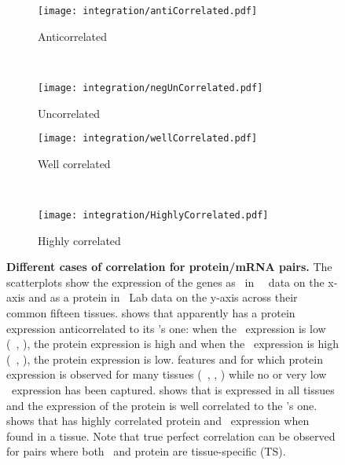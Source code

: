 \begin{figure}[!htbp]
    \begin{subfigure}[h]{0.49\textwidth}
        \centering \texttt{[image: integration/antiCorrelated.pdf]}
        \caption{Anticorrelated}\label{fig:caseAnticor}
    \end{subfigure}~%
    \begin{subfigure}[h]{0.49\textwidth}
        \centering \texttt{[image: integration/negUnCorrelated.pdf]}
        \caption{Uncorrelated}\label{fig:caseUncor}
    \end{subfigure}
    \vspace{1mm}

    \begin{subfigure}[h]{0.49\textwidth}
        \centering \texttt{[image: integration/wellCorrelated.pdf]}
        \caption{Well correlated}\label{fig:caseFairlyCor}
    \end{subfigure}~%
    \begin{subfigure}[h]{0.49\textwidth}
        \centering \texttt{[image: integration/HighlyCorrelated.pdf]}
        \caption{Highly correlated}\label{fig:caseHighlyCor}
    \end{subfigure}
    \vspace{-2mm}
    \caption[Different cases of correlation for protein/mRNA pairs]%
    {\label{fig:caseGene}\textbf{Different cases of correlation for
    protein/mRNA pairs.}
    The scatterplots show the expression of the genes
    as \mRNA\ in \uhlen\ \etal\ data on the x-axis and
    as a protein in \pandey\ Lab data on the y-axis
    across their common fifteen tissues.
     shows that  apparently
    has a protein expression anticorrelated to its \mRNA{}'s one:
    when the \mRNA\ expression is low (\eg\ \Pancreas, \Liver),
    the protein expression is high
    and when the \mRNA\ expression is high (\eg\ \Adrenal, \Prostate),
    the protein expression is low.
     features  and for which protein expression
    is observed for many tissues (\eg\ \Oesophagus, \Kidney, \Pancreas)
    while no or very low \mRNA\ expression has been captured.
     shows that  is expressed in all tissues
    and the expression of the protein is well correlated to the \mRNA{}'s one.
     shows that  has
    highly correlated protein and \mRNA\ expression when found in a tissue.
    Note that true perfect correlation can be observed for pairs
    where both \mRNA\ and protein are tissue-specific (TS).
    }
\end{figure}

